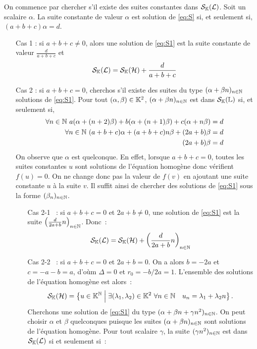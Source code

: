 On commence par chercher s'il existe des suites constantes dans \(\mathcal{S}_{\mathbb{K}}(\mathcal{L})\). Soit un scalaire \(\alpha\). La suite constante de valeur \(\alpha\) est solution de \eqref{eq:S} si, et seulement si, \((a+b+c)\alpha=d\).
\begin{itemize}
\item[Cas 1] : si \(a+b+c \neq 0\), alors une solution de \eqref{eq:S1} est la suite constante de valeur \(\frac{d}{a+b+c}\) et
  \begin{equation}
    \mathcal{S}_{\mathbb{K}}(\mathcal{L}) = \mathcal{S}_{\mathbb{K}}(\mathcal{H}) +\frac{d}{a+b+c}
  \end{equation}
\item[Cas 2] : si \(a+b+c=0\), cherchos s'il existe des suites du type \((\alpha+\beta n)_{n \in \mathbb{N}}\) solutions de \eqref{eq:S1}. Pour tout \((\alpha,\beta) \in \mathbb{K}^2\), \((\alpha + \beta n)_{n \in \mathbb{N}}\) est dans \(\mathcal{S}_{\mathbb{K}}(\mathbb{L})\) si, et seulement si,
  \begin{align}
    \forall n \in \mathbb{N} \ a(\alpha +(n+2)\beta)+b(\alpha+(n+1)\beta)+c(\alpha +n\beta) &=d \\
    \forall n \in \mathbb{N} \ (a+b+c)\alpha +(a+b+c)n\beta +(2a+b)\beta &=d\\
    (2a+b)\beta &=d
  \end{align}
  On observe que \(\alpha\) est quelconque. En effet, lorsque \(a+b+c=0\), toutes les suites constantes \(u\) sont solutions de l'équation homogène donc vérifient \(f(u)=0\). On ne change donc pas la valeur de \(f(v)\) en ajoutant une suite constante \(u\) à la suite \(v\). Il suffit ainsi de chercher des solutions de \eqref{eq:S1} sous la forme \((\beta_n)_{n \in \mathbb{N}}\).
  \begin{itemize}
  \item[Cas 2-1]~: si \(a+b+c=0\) et \(2a+b \neq 0\), une solution de \eqref{eq:S1} est la suite \(\left(\frac{d}{2a+b}n\right)_{n \in \mathbb{N}}\). Donc~:
    \begin{equation}
      \mathcal{S}_{\mathbb{K}}(\mathcal{L}) = \mathcal{S}_{\mathbb{K}}(\mathcal{H}) + \left(\frac{d}{2a+b}n\right)_{n \in \mathbb{N}}
    \end{equation}
  \item[Cas 2-2]~: si \(a+b+c=0\) et \(2a+b = 0\). On a alors \(b=-2a\) et \(c=-a-b=a\), d'oùm \(\Delta=0\) et \(r_0=-b/2a=1\). L'ensemble des solutions de l'équation homogène est alors~:
    \begin{equation}
      \mathcal{S}_{\mathbb{K}}(\mathcal{H}) = \left\{u \in \mathbb{K}^{\mathbb{N}}\mathrel{}\middle|\mathrel{}\exists (\lambda_1, \lambda_2) \in \mathbb{K}^2 \ \forall n \in \mathbb{N} \quad u_n = \lambda_1+\lambda_2 n\right\}.
    \end{equation}
    Cherchons une solution de \eqref{eq:S1} du type \((\alpha+\beta n + \gamma n^2)_{n \in \mathbb{N}}\). On peut choisir \(\alpha\) et \(\beta\) quelconques puisque les suites \((\alpha+\beta n)_{n \in \mathbb{N}}\) sont solutions de l'équation homogène. Pour tout scalaire \(\gamma\), la suite \((\gamma n^2)_{n \in \mathbb{N}}\) est dans \(\mathcal{S}_{\mathbb{K}}(\mathcal{L})\) si et seulement si~:

\end{itemize}
\end{itemize}
